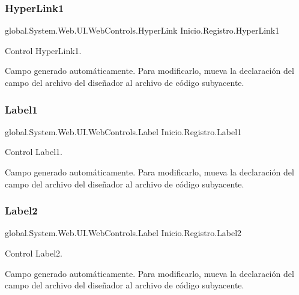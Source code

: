 \subsubsection{\texorpdfstring{HyperLink1}{HyperLink1}}
{\footnotesize\ttfamily global.\+System.\+Web.\+U\+I.\+Web\+Controls.\+Hyper\+Link Inicio.\+Registro.\+Hyper\+Link1\hspace{0.3cm}{\ttfamily [protected]}}



Control Hyper\+Link1. 

Campo generado automáticamente. Para modificarlo, mueva la declaración del campo del archivo del diseñador al archivo de código subyacente. \mbox{\label{classInicio_1_1Registro_a4ec239a90d4abd7bfd75de6f88d318c9}} 
\subsubsection{\texorpdfstring{Label1}{Label1}}
{\footnotesize\ttfamily global.\+System.\+Web.\+U\+I.\+Web\+Controls.\+Label Inicio.\+Registro.\+Label1\hspace{0.3cm}{\ttfamily [protected]}}



Control Label1. 

Campo generado automáticamente. Para modificarlo, mueva la declaración del campo del archivo del diseñador al archivo de código subyacente. \mbox{\label{classInicio_1_1Registro_ae7b4e658b3d377fe9acc4b4930616dae}} 
\subsubsection{\texorpdfstring{Label2}{Label2}}
{\footnotesize\ttfamily global.\+System.\+Web.\+U\+I.\+Web\+Controls.\+Label Inicio.\+Registro.\+Label2\hspace{0.3cm}{\ttfamily [protected]}}



Control Label2. 

Campo generado automáticamente. Para modificarlo, mueva la declaración del campo del archivo del diseñador al archivo de código subyacente. \mbox{\label{classInicio_1_1Registro_ae363d31acf3834211c8e17996e39782f}} 
